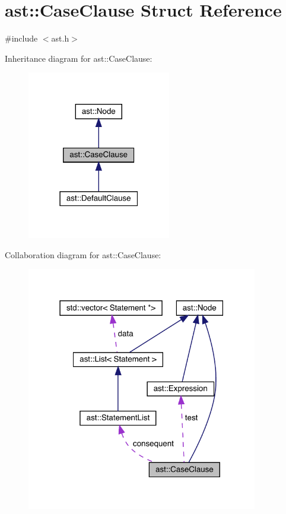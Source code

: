 \hypertarget{structast_1_1_case_clause}{}\section{ast\+:\+:Case\+Clause Struct Reference}
\label{structast_1_1_case_clause}


{\ttfamily \#include $<$ast.\+h$>$}



Inheritance diagram for ast\+:\+:Case\+Clause\+:\nopagebreak
\begin{figure}[H]
\begin{center}
\leavevmode
\includegraphics[width=178pt]{structast_1_1_case_clause__inherit__graph}
\end{center}
\end{figure}


Collaboration diagram for ast\+:\+:Case\+Clause\+:\nopagebreak
\begin{figure}[H]
\begin{center}
\leavevmode
\includegraphics[width=286pt]{structast_1_1_case_clause__coll__graph}
\end{center}
\end{figure}
